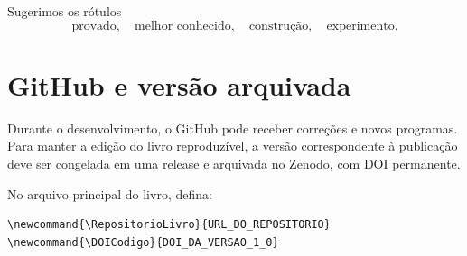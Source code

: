 Sugerimos os rótulos
\[
\boxed{\text{provado},\quad\text{melhor conhecido},\quad\text{construção},\quad\text{experimento}.}
\]

\section{GitHub e versão arquivada}
Durante o desenvolvimento, o GitHub pode receber correções e novos programas. Para manter a edição do livro reproduzível, a versão correspondente à publicação deve ser congelada em uma release e arquivada no Zenodo, com DOI permanente.

No arquivo principal do livro, defina:
\begin{verbatim}
\newcommand{\RepositorioLivro}{URL_DO_REPOSITORIO}
\newcommand{\DOICodigo}{DOI_DA_VERSAO_1_0}
\end{verbatim}
